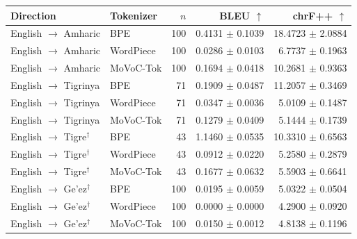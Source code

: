 \begin{tabular}{llrrr}
\toprule
Direction & Tokenizer & $n$ & BLEU $\uparrow$ & chrF++ $\uparrow$ \\
\midrule
English $\rightarrow$ Amharic & BPE & 100 & 0.4131 $\pm$ 0.1039 & 18.4723 $\pm$ 2.0884 \\
English $\rightarrow$ Amharic & WordPiece & 100 & 0.0286 $\pm$ 0.0103 & 6.7737 $\pm$ 0.1963 \\
English $\rightarrow$ Amharic & MoVoC-Tok & 100 & 0.1694 $\pm$ 0.0418 & 10.2681 $\pm$ 0.9363 \\
English $\rightarrow$ Tigrinya & BPE & 71 & 0.1909 $\pm$ 0.0487 & 11.2057 $\pm$ 0.3469 \\
English $\rightarrow$ Tigrinya & WordPiece & 71 & 0.0347 $\pm$ 0.0036 & 5.0109 $\pm$ 0.1487 \\
English $\rightarrow$ Tigrinya & MoVoC-Tok & 71 & 0.1279 $\pm$ 0.0409 & 5.1444 $\pm$ 0.1739 \\
English $\rightarrow$ Tigre$^{\dagger}$ & BPE & 43 & 1.1460 $\pm$ 0.0535 & 10.3310 $\pm$ 0.6563 \\
English $\rightarrow$ Tigre$^{\dagger}$ & WordPiece & 43 & 0.0912 $\pm$ 0.0220 & 5.2580 $\pm$ 0.2879 \\
English $\rightarrow$ Tigre$^{\dagger}$ & MoVoC-Tok & 43 & 0.1677 $\pm$ 0.0632 & 5.5903 $\pm$ 0.6641 \\
English $\rightarrow$ Ge'ez$^{\dagger}$ & BPE & 100 & 0.0195 $\pm$ 0.0059 & 5.0322 $\pm$ 0.0504 \\
English $\rightarrow$ Ge'ez$^{\dagger}$ & WordPiece & 100 & 0.0000 $\pm$ 0.0000 & 4.2900 $\pm$ 0.0920 \\
English $\rightarrow$ Ge'ez$^{\dagger}$ & MoVoC-Tok & 100 & 0.0150 $\pm$ 0.0012 & 4.8138 $\pm$ 0.1196 \\
\bottomrule
\end{tabular}
